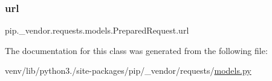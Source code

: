 \mbox{\label{classpip_1_1__vendor_1_1requests_1_1models_1_1PreparedRequest_af848e89a53867307f151d0be189067b2}} 
\subsubsection{\texorpdfstring{url}{url}}
{\footnotesize\ttfamily pip.\+\_\+vendor.\+requests.\+models.\+Prepared\+Request.\+url}



The documentation for this class was generated from the following file\+:\begin{DoxyCompactItemize}
\item 
venv/lib/python3./site-\/packages/pip/\+\_\+vendor/requests/\hyperlink{__vendor_2requests_2models_8py}{models.\+py}\end{DoxyCompactItemize}
